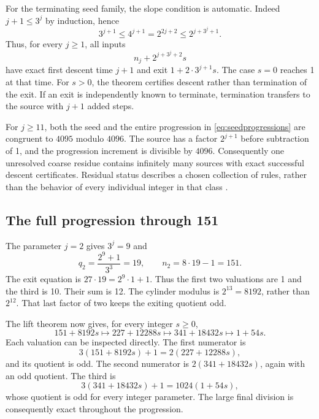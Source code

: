 For the terminating seed family, the slope condition is automatic. Indeed $j+1\le3^j$ by induction, hence
\[
3^{j+1}\le4^{j+1}=2^{2j+2}\le2^{j+3^j+1}.
\]
Thus, for every $j\ge1$, all inputs
\begin{equation}\label{eq:seedprogressions}
n_j+2^{j+3^j+2}s
\end{equation}
have exact first descent time $j+1$ and exit $1+2\cdot3^{j+1}s$. The case $s=0$ reaches 1 at that time. For $s>0$, the theorem certifies descent rather than termination of the exit. If an exit is independently known to terminate, termination transfers to the source with $j+1$ added steps.

For $j\ge11$, both the seed and the entire progression in \eqref{eq:seedprogressions} are congruent to $4095$ modulo $4096$. The source has a factor $2^{j+1}$ before subtraction of 1, and the progression increment is divisible by $4096$. Consequently one unresolved coarse residue contains infinitely many sources with exact successful descent certificates. Residual status describes a chosen collection of rules, rather than the behavior of every individual integer in that class \cite{projectcollatzlifts,projectcollatzboundary}.

\subsection{The full progression through 151}
The parameter $j=2$ gives $3^j=9$ and
\[
q_2=\frac{2^9+1}{3^3}=19,\qquad n_2=8\cdot19-1=151.
\]
The exit equation is $27\cdot19=2^9\cdot1+1$. Thus the first two valuations are 1 and the third is 10. Their sum is 12. The cylinder modulus is $2^{13}=8192$, rather than $2^{12}$. That last factor of two keeps the exiting quotient odd.

The lift theorem now gives, for every integer $s\ge0$,
\begin{equation}\label{eq:151lift}
151+8192s\longmapsto227+12288s
\longmapsto341+18432s\longmapsto1+54s.
\end{equation}
Each valuation can be inspected directly. The first numerator is
\[
3(151+8192s)+1=2(227+12288s),
\]
and its quotient is odd. The second numerator is $2(341+18432s)$, again with an odd quotient. The third is
\[
3(341+18432s)+1=1024(1+54s),
\]
whose quotient is odd for every integer parameter. The large final division is consequently exact throughout the progression.

